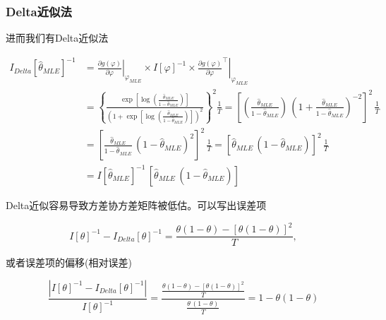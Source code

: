 \subsubsection{Delta近似法}\label{deltaux8fd1ux4f3cux6cd5}
进而我们有Delta近似法

\begin{equation}
  \begin{split}
    I_{Delta}[\widehat{\theta}_{MLE}]^{-1}
& = \left. \frac{\partial g(\varphi)}{\partial \varphi} \right|_{\varphi_{MLE}}
\times I[\varphi]^{-1} \times
\left. \frac{\partial g(\varphi)}{\partial \varphi}^{\top} \right|_{\varphi_{MLE}} \\
& = \left\{
\frac{
\exp \left[ \log \left( \frac{\widehat{\theta}_{MLE}}{1 - \widehat{\theta}_{MLE}} \right) \right]
}{
\left(
1 + \exp \left[ \log \left( \frac{\widehat{\theta}_{MLE}}{1 - \widehat{\theta}_{MLE}} \right) \right]
\right)^{2}
}
\right\}^{2} \frac{1}{T}
 = \left[
\left( \frac{\widehat{\theta}_{MLE}}{1 - \widehat{\theta}_{MLE}} \right)
\,
\left( 1 + \frac{\widehat{\theta}_{MLE}}{1 - \widehat{\theta}_{MLE}} \right)^{-2}
\right]^{2} \, \frac{1}{T} \\
& = \left[
\frac{\widehat{\theta}_{MLE}}{1 - \widehat{\theta}_{MLE}}
\,
\left(1 - \widehat{\theta}_{MLE} \right)^{2}
\right]^{2} \, \frac{1}{T}
= \left[ \widehat{\theta}_{MLE} \, \left( 1 - \widehat{\theta}_{MLE} \right) \right]^{2} \, \frac{1}{T} \\
& = I \left[ \widehat{\theta}_{MLE} \right]^{-1} \,
\left[
\widehat{\theta}_{MLE} \, \left( 1 - \widehat{\theta}_{MLE} \right)
\right]
  \end{split}
\end{equation}

Delta近似容易导致方差协方差矩阵被低估。可以写出误差项

\begin{equation}
I \left[ \theta \right]^{-1} - I_{Delta} \left[ \theta \right]^{-1} =
\frac{\theta \left( 1 - \theta \right) - \left[ \theta \left( 1 - \theta \right) \right]^{2}}{T},
\end{equation}

或者误差项的偏移(相对误差)

\begin{equation}
\frac{
\left| I \left[ \theta \right]^{-1} - I_{Delta} \left[ \theta \right]^{-1} \right|
}{
I \left[ \theta \right]^{-1}
} =
\frac{
\frac{\theta \left( 1 - \theta \right) - \left[ \theta \left( 1 - \theta \right) \right]^{2}}{T}
}{
\frac{\theta \, \left( 1 - \theta \right)}{T}
} = 1 - \theta \left( 1 - \theta \right)
\end{equation}

